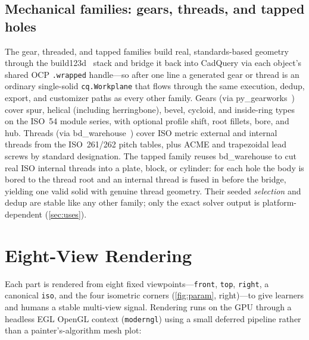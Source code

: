 \documentclass[11pt]{article}
\newcommand{\code}[1]{\texttt{#1}}
\newcommand{\fm}[1]{\textsf{\small #1}}
\begin{document}
\subsection{Mechanical families: gears, threads, and tapped holes}\label{sec:mech}
The \fm{gear}, \fm{threaded}, and \fm{tapped} families build real,
standards-based geometry through the build123d~\cite{build123d} stack and bridge
it back into CadQuery via each object's shared OCP \code{.wrapped}
handle---so after one line a generated gear or thread is an ordinary single-solid
\code{cq.Workplane} that flows through the same execution, dedup, export, and
customizer paths as every other family.
Gears (via py\_gearworks~\cite{pygearworks}) cover spur, helical (including
herringbone), bevel, cycloid, and inside-ring types on the ISO~54 module series,
with optional profile shift, root fillets, bore, and hub. Threads (via
bd\_warehouse~\cite{bdwarehouse}) cover ISO metric external and internal threads
from the ISO~261/262 pitch tables, plus ACME and trapezoidal lead screws by
standard designation. The \fm{tapped} family reuses bd\_warehouse to cut real ISO
internal threads into a plate, block, or cylinder: for each hole the body is bored
to the thread root and an internal thread is fused in before the bridge, yielding
one valid solid with genuine thread geometry. Their seeded \emph{selection} and
dedup are stable like any other family; only the exact solver output is
platform-dependent (\cref{sec:uses}).

\section{Eight-View Rendering}\label{sec:render}
Each part is rendered from eight fixed viewpoints---\code{front}, \code{top},
\code{right}, a canonical \code{iso}, and the four isometric corners
(\cref{fig:param}, right)---to give learners and humans a stable multi-view
signal. Rendering runs on the GPU through a headless EGL OpenGL context
(\code{moderngl}) using a small deferred pipeline rather than a painter's-algorithm
mesh plot:
\end{document}
